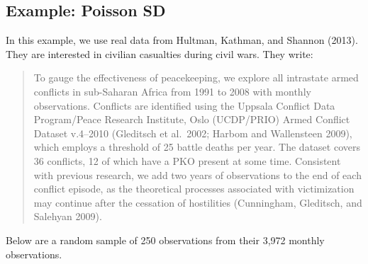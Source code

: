 \documentclass[
]{book}
\begin{document}
\hypertarget{example-poisson-sd}{%
\subsection{Example: Poisson SD}\label{example-poisson-sd}}

In this example, we use real data from Hultman, Kathman, and Shannon
(2013). They are interested in civilian casualties during civil wars.
They write:

\begin{quote}
To gauge the effectiveness of peacekeeping, we explore all intrastate
armed conflicts in sub-Saharan Africa from 1991 to 2008 with monthly
observations. Conflicts are identified using the Uppsala Conflict Data
Program/Peace Research Institute, Oslo (UCDP/PRIO) Armed Conflict
Dataset v.4--2010 (Gleditsch et al.~2002; Harbom and Wallensteen 2009),
which employs a threshold of 25 battle deaths per year. The dataset
covers 36 conflicts, 12 of which have a PKO present at some time.
Consistent with previous research, we add two years of observations to
the end of each conflict episode, as the theoretical processes
associated with victimization may continue after the cessation of
hostilities (Cunningham, Gleditsch, and Salehyan 2009).
\end{quote}

Below are a random sample of 250 observations from their 3,972 monthly
observations.
\end{document}
